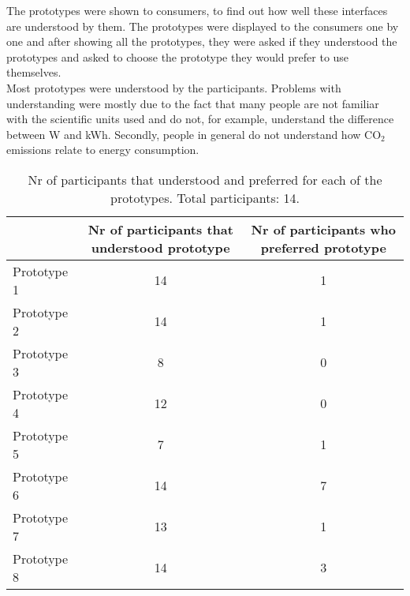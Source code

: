 \documentclass[journal]{vgtc}                %
\begin{document}
The prototypes were shown to consumers, to find out how well these interfaces are understood by them. The prototypes were displayed to the consumers one by one and after showing all the prototypes, they were asked if they understood the prototypes and asked to choose the prototype they would prefer to use themselves.\\

Most prototypes were understood by the participants. Problems with understanding were mostly due to the fact that many people are not familiar with the scientific units used and do not, for example, understand the difference between W and kWh. Secondly, people in general do not understand how CO$_2$ emissions relate to energy consumption.

\begin{table}
  \caption{Nr of participants that understood and preferred for each of the prototypes. Total participants: 14.}
  \label{prototypesresults}
  \scriptsize
  \begin{center}
    \begin{tabular}{|lcc|}
    \hline
       & \multicolumn{1}{p{2.5cm}}{\centering Nr of participants that understood prototype} & 
       \multicolumn{1}{p{3cm}|}{\centering Nr of participants who preferred prototype}  \\ \hline
       Prototype 1 & 14 & 1 \\ 
       Prototype 2 & 14 & 1 \\ 
       Prototype 3 & 8 & 0 \\ 
       Prototype 4 & 12 & 0 \\ 
       Prototype 5 & 7 & 1 \\ 
       Prototype 6 & 14 & 7 \\ 
       Prototype 7 & 13 & 1 \\ 
       Prototype 8 & 14 & 3 \\ \hline
    \end{tabular}
  \end{center}
\end{table}




~\\
\end{document}
